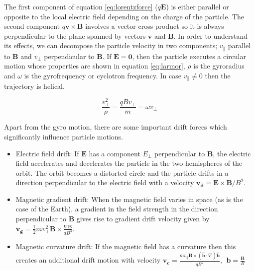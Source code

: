 The first component of equation \ref{eq:lorentzforce} ($q\mathbf{E}$) is either parallel or opposite to the local electric 
field depending on the charge of the particle. The second component $q\mathbf{v} \times \mathbf{B}$ involves a vector 
cross product so it is always perpendicular to the plane spanned by vectors $\mathbf{v}$ and $\mathbf{B}$. In order to 
understand its effects, we can decompose the particle velocity in two components; $v_{\parallel}$ parallel to $\mathbf{B}$ and 
$v_{\perp}$ perpendicular to $\mathbf{B}$. If $\mathbf{E} = \mathbf{0}$, then the particle executes a circular motion 
whose properties are shown in equation \ref{eq:larmor}, $\rho$ is the gyroradius and $\omega$ is the gyrofrequency or 
cyclotron frequency. In case $v_{\parallel} \neq 0$ then the trajectory is helical.

\begin{equation}\label{eq:larmor}
    \frac{v^{2}_{\perp}}{\rho} = \frac{qBv_{\perp}}{m} = \omega v_{\perp}
\end{equation}

Apart from the gyro motion, there are some important drift forces which significantly influence particle motions.

\begin{itemize}
    \item Electric field drift: If $\mathbf{E}$ has a component $E_{\perp}$ perpendicular to $\mathbf{B}$, the electric 
    field accelerates and decelerates the particle in the two hemispheres of the orbit. The orbit becomes 
    a distorted circle and the particle drifts in a direction perpendicular to the electric field with a velocity 
    $\mathbf{v_d} = \mathbf{E} \times \mathbf{B} / B^2$.

    \item Magnetic gradient drift: When the magnetic field varies in space (as is the case of the Earth), a 
    gradient in the field strength in the direction perpendicular to $\mathbf{B}$ gives rise to gradient 
    drift velocity given by $\mathbf{v_g} = \frac{1}{2} m v^2_{\perp}\mathbf{B} \times \frac{\nabla \mathbf{B}}{aB^3}$.

    \item Magnetic curvature drift: If the magnetic field has a curvature then this creates an additional 
    drift motion with velocity $\mathbf{v_c} = \frac{ m v_{\parallel} 
    \mathbf{B} \times (\hat{\mathbf{b}} \cdot \nabla) \hat{\mathbf{b}} }{qB^2}, 
    \ \ \mathbf{b} = \frac{\mathbf{B}}{B}$
\end{itemize}

